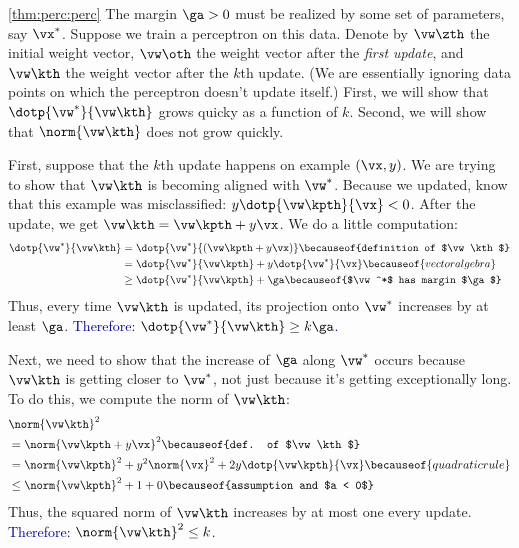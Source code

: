 \begin{myproof}{\ref{thm:perc:perc}}
  The margin $\ga > 0$ must be realized by some set of parameters, say
  $\vx^*$.  Suppose we train a perceptron on this data.  Denote by
  $\vw\zth$ the initial weight vector, $\vw\oth$ the weight vector
  after the \emph{first update}, and $\vw\kth$ the weight vector after
  the $k$th update.  (We are essentially ignoring data points on which
  the perceptron doesn't update itself.)  First, we will show that
  $\dotp{\vw^*}{\vw\kth}$ grows quicky as a function of $k$.  Second,
  we will show that $\norm{\vw\kth}$ does not grow quickly.

  First, suppose that the $k$th update happens on example $(\vx,y)$.
  We are trying to show that $\vw\kth$ is becoming aligned with
  $\vw^*$.  Because we updated, know that this example was
  misclassified: $y \dotp{\vw\kpth}{\vx} < 0$.  After the update, we get
  $\vw\kth = \vw\kpth + y \vx$.  We do a little computation:
  \begin{align}
    \dotp{\vw^*}{\vw\kth}
    &= \dotp{\vw^*}{\left(\vw\kpth + y \vx\right)} 
         \becauseof{definition of $\vw\kth$}
    \\
    &= \dotp{\vw^*}{\vw\kpth} + y \dotp{\vw^*}{\vx}
         \becauseof{vector algebra}
    \\
    &\geq \dotp{\vw^*}{\vw\kpth} + \ga
         \becauseof{$\vw^*$ has margin $\ga$}
  \end{align}
  Thus, every time $\vw\kth$ is updated, its projection onto $\vw^*$
  increases by at least $\ga$.  \textcolor{darkblue}{Therefore:
    $\dotp{\vw^*}{\vw\kth} \geq k \ga$.}

  Next, we need to show that the increase of $\ga$ along $\vw^*$
  occurs because $\vw\kth$ is getting closer to $\vw^*$, not just
  because it's getting exceptionally long.  To do this, we compute the
  norm of $\vw\kth$:
  \begin{align}
    & \norm{\vw\kth}^2 \nonumber\\
    &= \norm{\vw\kpth + y \vx}^2
         \becauseof{def. of $\vw\kth$} \\
    &= \norm{\vw\kpth}^2 + y^2 \norm{\vx}^2 + 2 y \dotp{\vw\kpth}{\vx}
         \becauseof{quadratic rule} \\
    &\leq \norm{\vw\kpth}^2 + 1 + 0
         \becauseof{assumption and $a < 0$}
  \end{align}
  Thus, the squared norm of $\vw\kth$ increases by at most one every
  update.  \textcolor{darkblue}{Therefore: $\norm{\vw\kth}^2 \leq k$.}


\end{myproof}

